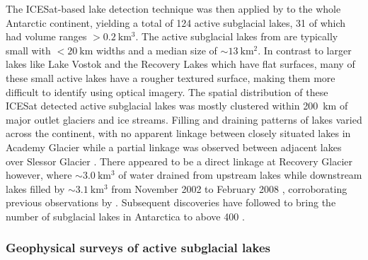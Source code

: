 The ICESat-based lake detection technique was then applied by \citet{Smithinventoryactivesubglacial2009} to the whole Antarctic continent, yielding a total of 124 active subglacial lakes, 31 of which had volume ranges $> \SI{0.2}{\kilo\metre\cubed}$.
The active subglacial lakes from \citet{Smithinventoryactivesubglacial2009} are typically small with $< \SI{20}{\kilo\metre}$ widths and a median size of $\sim\SI{13}{\kilo\metre\squared}$.
In contrast to larger lakes like Lake Vostok and the Recovery Lakes which have flat surfaces, many of these small active lakes have a rougher textured surface, making them more difficult to identify using optical imagery.
The spatial distribution of these ICESat detected active subglacial lakes was mostly clustered within \SI{200}{\kilo\metre} of major outlet glaciers and ice streams.
Filling and draining patterns of lakes varied across the continent, with no apparent linkage between closely situated lakes in Academy Glacier while a partial linkage was observed between adjacent lakes over Slessor Glacier \citep{Smithinventoryactivesubglacial2009}.
There appeared to be a direct linkage at Recovery Glacier however, where $\sim\SI{3.0}{\kilo\metre\cubed}$ of water drained from upstream lakes while downstream lakes filled by $\sim\SI{3.1}{\kilo\metre\cubed}$ from November 2002 to February 2008 \citep{Smithinventoryactivesubglacial2009}, corroborating previous observations by \citet{BellLargesubglaciallakes2007}.
Subsequent discoveries have followed to bring the number of subglacial lakes in Antarctica to above 400 \citep[e.g.][]{WrightEvidencehydrologicalconnection2012,WrightSubglacialhydrologicalconnectivity2014,RiveraSubglacialLakeCECs2015,KimActivesubglaciallakes2016,SmithConnectedsubglaciallake2017,NapoleoniSubglaciallakeshydrology2020}.


\subsubsection{Geophysical surveys of active subglacial lakes}

